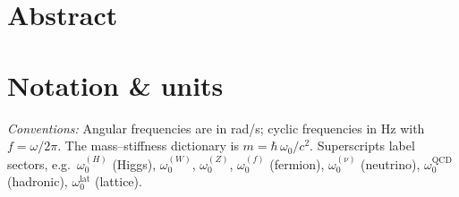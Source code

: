 \documentclass[11pt,oneside]{article}
\title{\PaperTitleMain}
\author{\Authors}
\author{\AuthorName}
\author{Author Name}
\date{\today}
\begin{document}
\maketitle


\clearpage
\section*{Abstract}


\clearpage
\section*{Notation \& units}
\noindent\textit{Conventions:} Angular frequencies are in rad/s; cyclic frequencies in Hz with $f=\omega/2\pi$. The mass--stiffness dictionary is $m=\hbar\,\omega_0/c^2$. Superscripts label sectors, e.g.\ $\omega_0^{(H)}$ (Higgs), $\omega_0^{(W)}$, $\omega_0^{(Z)}$, $\omega_0^{(f)}$ (fermion), $\omega_0^{(\nu)}$ (neutrino), $\omega_0^{\mathrm{QCD}}$ (hadronic), $\omega_0^{\mathrm{lat}}$ (lattice).
\end{document}
